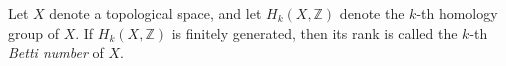 \documentclass[12pt]{article}
\newcommand{\mb}{\mathbb}
\newcommand{\Z}{\mb{Z}}
\newcommand{\<}{\langle}
\renewcommand{\>}{\rangle}
\begin{document}

Let $X$ denote a topological space, and let $H_k(X,\Z)$ denote the $k$-th homology group of $X$.  If $H_k(X,\Z)$ is finitely generated, then its rank is called the $k$-th \emph{Betti number} of $X$.
\end{document}
